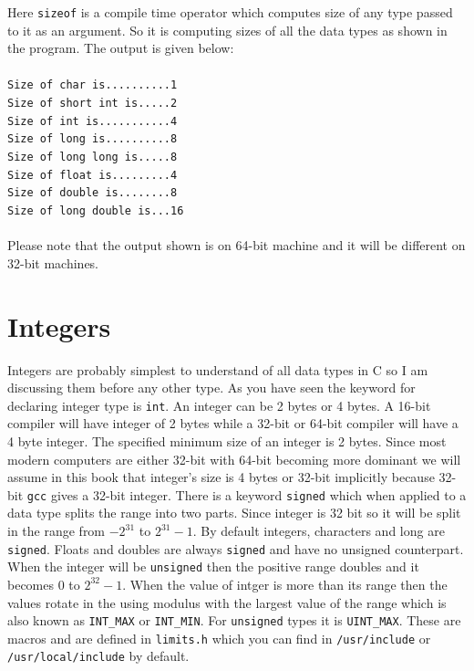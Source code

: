 Here \texttt{sizeof} is a compile time operator which computes size of any type
passed to it as an argument. So it is computing sizes of all the data types as
shown in the program. The output is given below:
\\\\\texttt{Size of char is..........1\\
Size of short int is.....2\\
Size of int is...........4\\
Size of long is..........8\\
Size of long long is.....8\\
Size of float is.........4\\
Size of double is........8\\
Size of long double is...16\\\\}
Please note that the output shown is on 64-bit machine and it will be different
on 32-bit machines.

\section{Integers}
Integers are probably simplest to understand of all data types in C so I am
discussing them before any other type. As you have seen the keyword for
declaring integer type is \texttt{int}. An integer can be 2 bytes or 4 bytes. A
16-bit compiler will have integer of 2 bytes while a 32-bit or 64-bit compiler
will have a 4 byte integer. The specified minimum size of an integer is 2
bytes. Since most modern computers are either 32-bit with
64-bit becoming more dominant we will assume in this book that integer's size
is 4 bytes or 32-bit implicitly because 32-bit \texttt{gcc} gives a 32-bit
integer. There is a keyword \texttt{signed} which when 
applied to a data type splits the range into two parts. Since integer is 32
bit so it will be split in the range from $-2^{31}$ to $2^{31} - 1$. By default
integers, characters and long are \texttt{signed}. Floats and doubles are
always \texttt{signed} and have no unsigned counterpart. When the integer will
be \texttt{unsigned} then the positive range doubles and it becomes $0$ to
$2^{32} - 1$. When the value of intger is more than its range then the values
rotate in the using modulus with the largest value of the range which is also
known as \texttt{INT\_MAX} or \texttt{INT\_MIN}. For \texttt{unsigned} types it
is \texttt{UINT\_MAX}. These are macros and are defined in \texttt{limits.h}
which you can find in \texttt{/usr/include} or \texttt{/usr/local/include} by
default.

